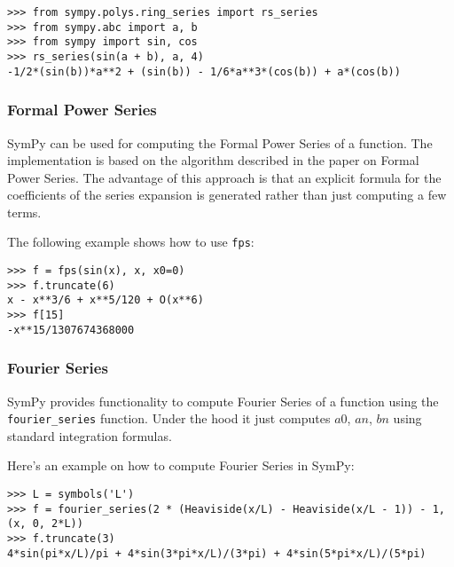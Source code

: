 \begin{verbatim}
>>> from sympy.polys.ring_series import rs_series
>>> from sympy.abc import a, b
>>> from sympy import sin, cos
>>> rs_series(sin(a + b), a, 4)
-1/2*(sin(b))*a**2 + (sin(b)) - 1/6*a**3*(cos(b)) + a*(cos(b))
\end{verbatim}

\subsubsection{Formal Power Series}

SymPy can be used for computing the Formal Power Series of a function.
The implementation is based on the algorithm described in the paper on
Formal Power Series\cite{Gruntz93formalpower}.  The advantage of this approach is
that an explicit formula for the coefficients of the series expansion is generated
rather than just computing a few terms.

The following example shows how to use \texttt{fps}:

\begin{verbatim}
>>> f = fps(sin(x), x, x0=0)
>>> f.truncate(6)
x - x**3/6 + x**5/120 + O(x**6)
>>> f[15]
-x**15/1307674368000
\end{verbatim}

\subsubsection{Fourier Series}

SymPy provides functionality to compute Fourier Series of a function using
the \texttt{fourier\_series} function. Under the hood it just computes $a0$, $an$, $bn$ using
standard integration formulas.

Here's an example on how to compute Fourier Series in SymPy:

\begin{verbatim}
>>> L = symbols('L')
>>> f = fourier_series(2 * (Heaviside(x/L) - Heaviside(x/L - 1)) - 1, (x, 0, 2*L))
>>> f.truncate(3)
4*sin(pi*x/L)/pi + 4*sin(3*pi*x/L)/(3*pi) + 4*sin(5*pi*x/L)/(5*pi)
\end{verbatim}
